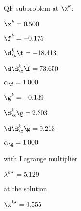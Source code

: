 QP subproblem at $\x^{k}$:

\bigskip
$\x^k=   0.500$


$\f^k =  -0.175$

$\d^k_{\x} \f = -18.413$

$\d\d^k_{\x} \tilde \f =  73.650$

$\alpha_{\footnotesize\f} =   1.000$

\bigskip
$\g^k =  -0.139$

$\d^k_{\x}\g =   2.303$

$\d\d^k_{\x} \tilde \g =   9.213$

$\alpha_{\footnotesize\g} =   1.000$

\bigskip
with Lagrange multiplier

$\lambda^{k\star} =   5.129$

at the solution

$\x^{k\star} =   0.555$


